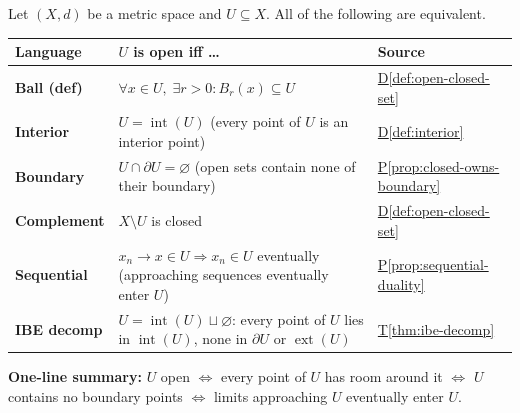 \bigskip


\begin{tcolorbox}[colback=gray!6, colframe=gray!40, arc=2pt,
  left=8pt, right=8pt, top=6pt, bottom=6pt,
  title={\small\textbf{Part II \enspace Open Sets — Every Characterisation}},
  fonttitle=\small\bfseries]
\small
Let $(X,d)$ be a metric space and $U \subseteq X$.
All of the following are equivalent.
\renewcommand{\arraystretch}{1.55}
\begin{tabular}{p{2.0cm} p{6.4cm} p{3.8cm}}
\toprule
\textbf{Language} & \textbf{$U$ is open iff \ldots} & \textbf{Source} \\
\midrule

\textbf{Ball (def)}
  & $\forall x \in U,\; \exists r > 0 : B_r(x) \subseteq U$
  & \hyperref[def:open-closed-set]{D\ref*{def:open-closed-set}} \\[2pt]

\textbf{Interior}
  & $U = \operatorname{int}(U)$
    \newline (every point of $U$ is an interior point)
  & \hyperref[def:interior]{D\ref*{def:interior}} \\[2pt]

\textbf{Boundary}
  & $U \cap \partial U = \varnothing$
    \newline (open sets contain none of their boundary)
  & \hyperref[prop:closed-owns-boundary]{P\ref*{prop:closed-owns-boundary}} \\[2pt]

\textbf{Complement}
  & $X \setminus U$ is closed
  & \hyperref[def:open-closed-set]{D\ref*{def:open-closed-set}} \\[2pt]

\textbf{Sequential}
  & $x_n \to x \in U \Rightarrow x_n \in U$ eventually
    \newline (approaching sequences eventually enter $U$)
  & \hyperref[prop:sequential-duality]{P\ref*{prop:sequential-duality}} \\[2pt]

\textbf{IBE decomp}
  & $U = \operatorname{int}(U) \sqcup \varnothing$:
    every point of $U$ lies in $\operatorname{int}(U)$,
    none in $\partial U$ or $\operatorname{ext}(U)$
  & \hyperref[thm:ibe-decomp]{T\ref*{thm:ibe-decomp}} \\[2pt]

\bottomrule
\end{tabular}

\medskip
\noindent\textbf{One-line summary:} \;
$U$ open $\iff$ every point of $U$ has room around it $\iff$
$U$ contains no boundary points $\iff$ limits approaching $U$ eventually enter $U$.
\end{tcolorbox}

